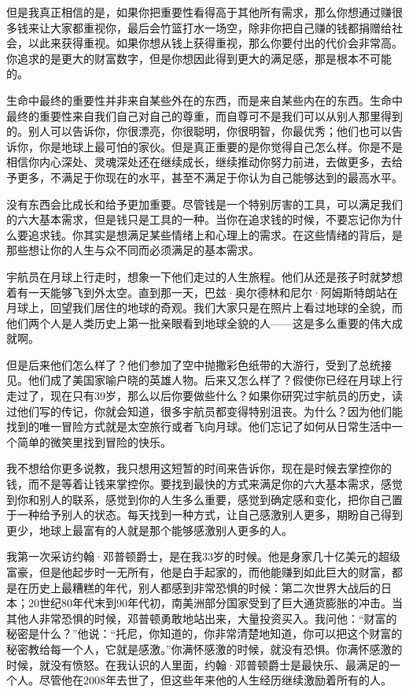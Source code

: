 但是我真正相信的是，如果你把重要性看得高于其他所有需求，那么你想通过赚很多钱来让大家都重视你，最后会竹篮打水一场空，除非你把自己赚的钱都捐赠给社会，以此来获得重视。如果你想从钱上获得重视，那么你要付出的代价会非常高。你追求的是更大的财富数字，但是你想因此得到更大的满足感，那是根本不可能的。

生命中最终的重要性并非来自某些外在的东西，而是来自某些内在的东西。生命中最终的重要性来自我们自己对自己的尊重，而自尊可不是我们可以从别人那里得到的。别人可以告诉你，你很漂亮，你很聪明，你很明智，你最优秀；他们也可以告诉你，你是地球上最可怕的家伙。但是真正重要的是你觉得自己怎么样。你是不是相信你内心深处、灵魂深处还在继续成长，继续推动你努力前进，去做更多，去给予更多，不满足于你现在的水平，甚至不满足于你认为自己能够达到的最高水平。

没有东西会比成长和给予更加重要。尽管钱是一个特别厉害的工具，可以满足我们的六大基本需求，但是钱只是工具的一种。当你在追求钱的时候，不要忘记你为什么要追求钱。你其实是想满足某些情绪上和心理上的需求。在这些情绪的背后，是那些想让你的人生与众不同而必须满足的基本需求。

宇航员在月球上行走时，想象一下他们走过的人生旅程。他们从还是孩子时就梦想着有一天能够飞到外太空。直到那一天，巴兹·奥尔德林和尼尔·阿姆斯特朗站在月球上，回望我们居住的地球的奇观。我们大家只是在照片上看过地球的全貌，而他们两个人是人类历史上第一批亲眼看到地球全貌的人——这是多么重要的伟大成就啊。

但是后来他们怎么样了？他们参加了空中抛撒彩色纸带的大游行，受到了总统接见。他们成了美国家喻户晓的英雄人物。后来又怎么样了？假使你已经在月球上行走过了，现在只有39岁，那么以后你要做些什么？如果你研究过宇航员的历史，读过他们写的传记，你就会知道，很多宇航员都变得特别沮丧。为什么？因为他们能找到的唯一冒险方式就是太空旅行或者飞向月球。他们忘记了如何从日常生活中一个简单的微笑里找到冒险的快乐。

我不想给你更多说教，我只想用这短暂的时间来告诉你，现在是时候去掌控你的钱，而不是等着让钱来掌控你。要找到最快的方式来满足你的六大基本需求，感觉到你和别人的联系，感觉到你的人生多么重要，感觉到确定感和变化，把你自己置于一种给予别人的状态。每天找到一种方式，让自己感激别人更多，期盼自己得到更少，地球上最富有的人就是那个能够感激别人更多的人。

我第一次采访约翰·邓普顿爵士，是在我33岁的时候。他是身家几十亿美元的超级富豪，但是他起步时一无所有，他是白手起家的，而他能赚到如此巨大的财富，都是在历史上最糟糕的年代，别人都感到非常恐惧的时候：第二次世界大战后的日本；20世纪80年代末到90年代初，南美洲部分国家受到了巨大通货膨胀的冲击。当其他人非常恐惧的时候，邓普顿勇敢地站出来，大量投资买入。我问他：“财富的秘密是什么？”他说：“托尼，你知道的，你非常清楚地知道，你可以把这个财富的秘密教给每一个人，它就是感激。”你满怀感激的时候，就没有恐惧。你满怀感激的时候，就没有愤怒。在我认识的人里面，约翰·邓普顿爵士是最快乐、最满足的一个人。尽管他在2008年去世了，但这些年来他的人生经历继续激励着所有的人。

